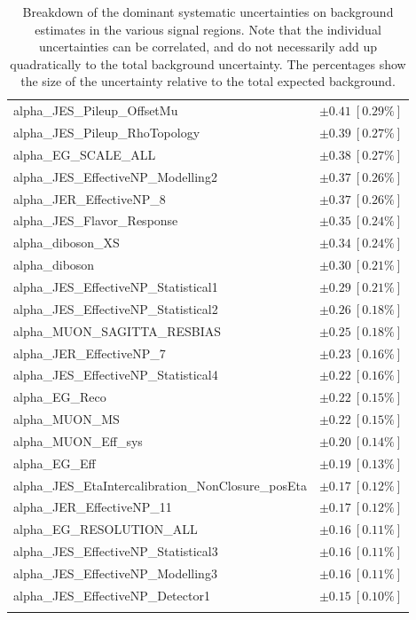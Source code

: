 \begin{table}
\begin{center}
\begin{tabular*}{\textwidth}{@{\extracolsep{\fill}}lc}
alpha\_JES\_Pileup\_OffsetMu         & $\pm 0.41\ [0.29\%] $       \\
alpha\_JES\_Pileup\_RhoTopology         & $\pm 0.39\ [0.27\%] $       \\
alpha\_EG\_SCALE\_ALL         & $\pm 0.38\ [0.27\%] $       \\
alpha\_JES\_EffectiveNP\_Modelling2         & $\pm 0.37\ [0.26\%] $       \\
alpha\_JER\_EffectiveNP\_8         & $\pm 0.37\ [0.26\%] $       \\
alpha\_JES\_Flavor\_Response         & $\pm 0.35\ [0.24\%] $       \\
alpha\_diboson\_XS         & $\pm 0.34\ [0.24\%] $       \\
alpha\_diboson         & $\pm 0.30\ [0.21\%] $       \\
alpha\_JES\_EffectiveNP\_Statistical1         & $\pm 0.29\ [0.21\%] $       \\
alpha\_JES\_EffectiveNP\_Statistical2         & $\pm 0.26\ [0.18\%] $       \\
alpha\_MUON\_SAGITTA\_RESBIAS         & $\pm 0.25\ [0.18\%] $       \\
alpha\_JER\_EffectiveNP\_7         & $\pm 0.23\ [0.16\%] $       \\
alpha\_JES\_EffectiveNP\_Statistical4         & $\pm 0.22\ [0.16\%] $       \\
alpha\_EG\_Reco         & $\pm 0.22\ [0.15\%] $       \\
alpha\_MUON\_MS         & $\pm 0.22\ [0.15\%] $       \\
alpha\_MUON\_Eff\_sys         & $\pm 0.20\ [0.14\%] $       \\
alpha\_EG\_Eff         & $\pm 0.19\ [0.13\%] $       \\
alpha\_JES\_EtaIntercalibration\_NonClosure\_posEta         & $\pm 0.17\ [0.12\%] $       \\
alpha\_JER\_EffectiveNP\_11         & $\pm 0.17\ [0.12\%] $       \\
alpha\_EG\_RESOLUTION\_ALL         & $\pm 0.16\ [0.11\%] $       \\
alpha\_JES\_EffectiveNP\_Statistical3         & $\pm 0.16\ [0.11\%] $       \\
alpha\_JES\_EffectiveNP\_Modelling3         & $\pm 0.16\ [0.11\%] $       \\
alpha\_JES\_EffectiveNP\_Detector1         & $\pm 0.15\ [0.10\%] $       \\
\noalign{\smallskip}\hline\noalign{\smallskip}
\end{tabular*}
\end{center}
\caption[Breakdown of uncertainty on background estimates]{
Breakdown of the dominant systematic uncertainties on background estimates in the various signal regions.
Note that the individual uncertainties can be correlated, and do not necessarily add up quadratically to 
the total background uncertainty. The percentages show the size of the uncertainty relative to the total expected background.
\label{table.results.bkgestimate.uncertainties.WREM_cuts}}
\end{table}
%